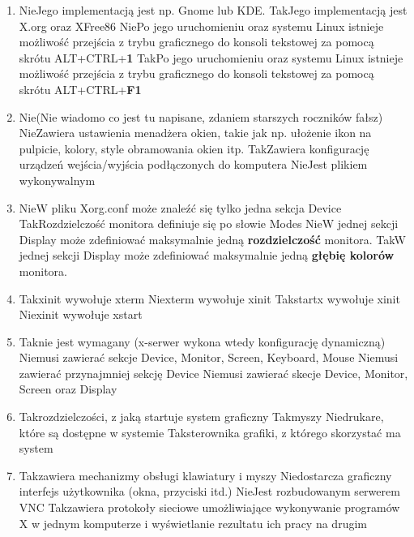 \begin{enumerate}
	\item {}
	{Nie}{Jego implementacją jest np. Gnome lub KDE.}
	{Tak}{Jego implementacją jest X.org oraz XFree86}
	{Nie}{Po jego uruchomieniu oraz systemu Linux istnieje możliwość przejścia z trybu graficznego do konsoli tekstowej za pomocą skrótu ALT+CTRL+\textbf{1}}
	{Tak}{Po jego uruchomieniu oraz systemu Linux istnieje możliwość przejścia z trybu graficznego do konsoli tekstowej za pomocą skrótu ALT+CTRL+\textbf{F1}}
	
	\item {}
	{Nie}{(Nie wiadomo co jest tu napisane, zdaniem starszych roczników fałsz)}
	{Nie}{Zawiera ustawienia menadżera okien, takie jak np. ułożenie ikon na pulpicie, kolory, style obramowania okien itp.}
	{Tak}{Zawiera konfigurację urządzeń wejścia/wyjścia podłączonych do komputera}
	{Nie}{Jest plikiem wykonywalnym}
	
	\item {}
	{Nie}{W pliku Xorg.conf może znaleźć się tylko jedna sekcja Device}
	{Tak}{Rozdzielczość monitora definiuje się po słowie Modes}
	{Nie}{W jednej sekcji Display może zdefiniować maksymalnie jedną \textbf{rozdzielczość} monitora.}
	{Tak}{W jednej sekcji Display może zdefiniować maksymalnie jedną \textbf{głębię kolorów} monitora.}
	
	\item {}
	{Tak}{xinit wywołuje xterm}
	{Nie}{xterm wywołuje xinit}
	{Tak}{startx wywołuje xinit}
	{Nie}{xinit wywołuje xstart}
	
	\item {}
	{Tak}{nie jest wymagany (x-serwer wykona wtedy konfigurację dynamiczną)}
	{Nie}{musi zawierać sekcje Device, Monitor, Screen, Keyboard, Mouse}
	{Nie}{musi zawierać przynajmniej sekcję Device}
	{Nie}{musi zawierać skecje Device, Monitor, Screen oraz Display}
	
	\item {}
	{Tak}{rozdzielczości, z jaką startuje system graficzny}
	{Tak}{myszy}
	{Nie}{drukare, które są dostępne w systemie}
	{Tak}{sterownika grafiki, z którego skorzystać ma system}
	
	\item {}
	{Tak}{zawiera mechanizmy obsługi klawiatury i myszy}
	{Nie}{dostarcza graficzny interfejs użytkownika (okna, przyciski itd.)}
	{Nie}{Jest rozbudowanym serwerem VNC}
	{Tak}{zawiera protokoły sieciowe umożliwiające wykonywanie programów X w jednym komputerze i wyświetlanie rezultatu ich pracy na drugim}
	

\end{enumerate}

